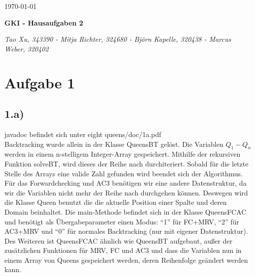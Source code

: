 \documentclass[a4paper]{article}
\begin{document}
  \begin{flushright}
    \today
  \end{flushright}
  \begin{center}
    \Large\textbf{{GKI - Hausaufgaben 2}}\\
  \end{center}

  \begin{center}
        \large\textsl{Tao Xu, 343390 - Mitja Richter, 324680 - Björn Kapelle, 320438 - Marcus Weber, 320402}\\
  \end{center}
\section*{Aufgabe 1}
\subsection*{1.a)}
javadoc befindet sich unter eight queens/doc/1a.pdf\\

Backtracking wurde allein in der Klasse QueensBT gelöst. Die Variablen $Q_1-Q_n$ werden in einem n-stelligem Integer-Array gespeichert. Mithilfe der rekursiven Funktion solveBT, wird dieses der Reihe nach durchiteriert. Sobald für die letzte Stelle des Arrays eine valide Zahl gefunden wird beendet sich der Algorithmus.\\

Für das Forwardchecking und AC3 benötigen wir eine andere Datenstruktur, da wir die Variablen nicht mehr der Reihe nach durchgehen können. Deswegen wird die Klasse Queen benutzt die die aktuelle Position einer Spalte und deren Domain beinhaltet. 
Die main-Methode befindet sich in der Klasse QueensFCAC und benötigt als Übergabeparameter einen Modus: "`1"' für FC+MRV, "`2"' für AC3+MRV und "`0"' für normales Backtracking (nur mit eigener Datenstruktur). Des Weiteren ist QueensFCAC ähnlich wie QueensBT aufgebaut, außer der zusätzlichen Funktionen für MRV, FC und AC3 und dass die Variablen nun  in einem Array von Queens gespeichert werden, deren Reihenfolge geändert werden kann.\\
\end{document}
